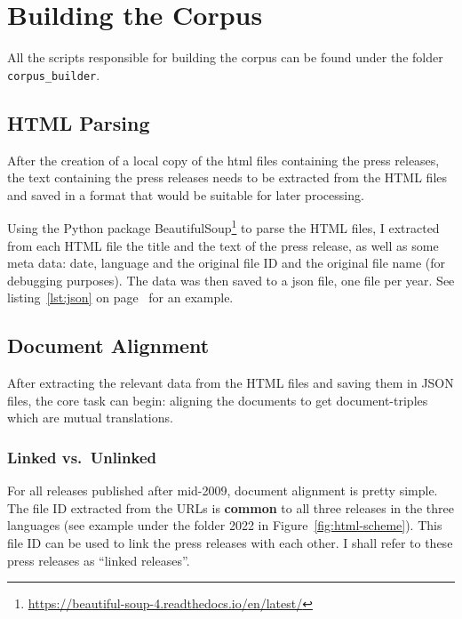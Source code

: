 \section{Building the Corpus}
All the scripts responsible for building the corpus can be found under the folder \texttt{corpus\_builder}.

\subsection{HTML Parsing}
After the creation of a local copy of the \acrshort{html} files containing the press releases, the text containing the press releases needs to be extracted from the HTML files and saved in a format that would be suitable for later processing.

Using the Python package BeautifulSoup\footnote{\url{https://beautiful-soup-4.readthedocs.io/en/latest/}} to parse the HTML files, I extracted from each HTML file the title and the text of the press release, as well as some meta data: date, language and the original file ID and the original file name (for debugging purposes).  
The data was then saved to a \gls{json}\footnotemark{} file, one file per year.
See listing~\ref{lst:json} on page~\pageref{lst:json} for an example.




\subsection{Document Alignment}
After extracting the relevant data from the HTML files and saving them in \acrshort{JSON} files, the core task can begin: aligning the documents to get document-triples which are mutual translations.

\subsubsection{Linked vs.~Unlinked}
\label{sec:linked-unlinked}
For all releases published after mid-2009, document alignment is pretty simple. 
The file ID extracted from the URLs is \textbf{common} to all three releases in the three languages (see example under the folder 2022 in Figure~\ref{fig:html-scheme}). 
This file ID can be used to link the press releases with each other. 
I shall refer to these press releases as \enquote{linked releases}.


